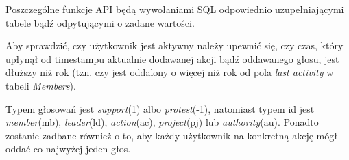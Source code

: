 \documentclass[12pt, a4paper]{article}
\begin{document}
Poszczególne funkcje API będą wywołaniami SQL odpowiednio uzupełniającymi tabele bądź odpytującymi o zadane wartości.

Aby sprawdzić, czy użytkownik jest aktywny należy upewnić się, czy czas, który upłynął od timestampu aktualnie dodawanej akcji bądź oddawanego głosu, jest dłuższy niż rok (tzn. czy jest oddalony o więcej niż rok od pola \textit{last activity} w tabeli \textit{Members}).

Typem głosowań jest \textit{support}(1) albo \textit{protest}(-1), natomiast typem id jest \textit{member}(mb), \textit{leader}(ld), \textit{action}(ac), \textit{project}(pj) lub \textit{authority}(au). Ponadto zostanie zadbane również o to, aby każdy użytkownik na konkretną akcję mógł oddać co najwyżej jeden głos.
\end{document}
